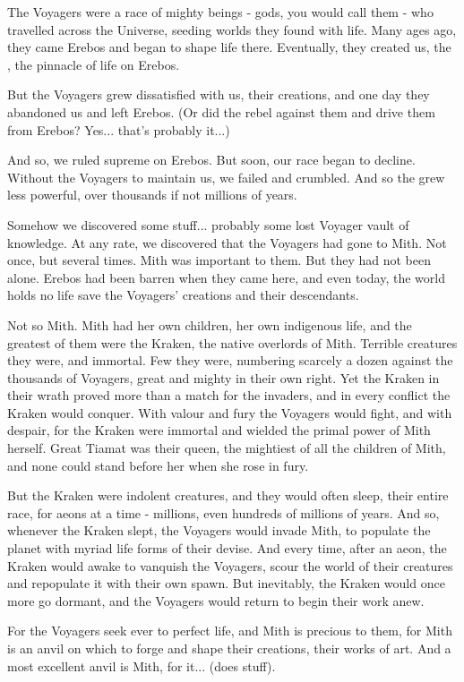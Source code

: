 The Voyagers were a race of mighty beings - gods, you would call them - who travelled across the Universe, seeding worlds they found with life. Many ages ago, they came Erebos and began to shape life there. Eventually, they created us, the \banes, the pinnacle of life on Erebos. 

But the Voyagers grew dissatisfied with us, their creations, and one day they abandoned us and left Erebos. (Or did the \banes{} rebel against them and drive them from Erebos? Yes... that's probably it...) 

And so, we ruled supreme on Erebos. But soon, our race began to decline. Without the Voyagers to maintain us, we failed and crumbled. And so the \banes{} grew less powerful, over thousands if not millions of years. 

Somehow we discovered some stuff... probably some lost Voyager vault of knowledge. At any rate, we discovered that the Voyagers had gone to Mith. Not once, but several times. Mith was important to them. But they had not been alone. Erebos had been barren when they came here, and even today, the world holds no life save the Voyagers' creations and their descendants. 

Not so Mith. Mith had her own children, her own indigenous life, and the greatest of them were the Kraken, the native overlords of Mith. Terrible creatures they were, and immortal. Few they were, numbering scarcely a dozen against the thousands of Voyagers, great and mighty in their own right. Yet the Kraken in their wrath proved more than a match for the invaders, and in every conflict the Kraken would conquer. With valour and fury the Voyagers would fight, and with despair, for the Kraken were immortal and wielded the primal power of Mith herself. Great Tiamat was their queen, the mightiest of all the children of Mith, and none could stand before her when she rose in fury. 

But the Kraken were indolent creatures, and they would often sleep, their entire race, for aeons at a time - millions, even hundreds of millions of years. And so, whenever the Kraken slept, the Voyagers would invade Mith, to populate the planet with myriad life forms of their devise. And every time, after an aeon, the Kraken would awake to vanquish the Voyagers, scour the world of their creatures and repopulate it with their own spawn. But inevitably, the Kraken would once more go dormant, and the Voyagers would return to begin their work anew. 

For the Voyagers seek ever to perfect life, and Mith is precious to them, for Mith is an anvil on which to forge and shape their creations, their works of art. And a most excellent anvil is Mith, for it... (does stuff). 

